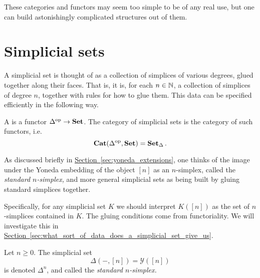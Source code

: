 \documentclass[main.tex]{subfiles}
\begin{document}
These categories and functors may seem too simple to be of any real use, but one can build astonishingly complicated structures out of them.

\section{Simplicial sets}
\label{sec:simplicial_sets}

A simplicial set is thought of as a collection of simplices of various degrees, glued together along their faces. That is, it is, for each $n \in \mathbb{N}$, a collection of simplices of degree $n$, together with rules for how to glue them. This data can be specified efficiently in the following way.

\begin{definition}
  \label{def:simplicial_set}
  A  is a functor $\Delta^{\mathrm{op}} \to \mathbf{Set}$. The category of simplicial sets is the category of such functors, i.e.\
  \begin{equation*}
    \mathbf{Cat}(\Delta^{\mathrm{op}}, \mathbf{Set}) = \operatorname{\mathbf{Set}_{\Delta}}.
  \end{equation*}
\end{definition}

As discussed briefly in \hyperref[sec:yoneda_extensions]{Section~\ref*{sec:yoneda_extensions}}, one thinks of the image under the Yoneda embedding of the object $[n]$ as an $n$-simplex, called the \emph{standard $n$-simplex,} and more general simplicial sets as being built by gluing standard simplices together.

Specifically, for any simplicial set $K$ we should interpret $K([n])$ as the set of $n$-simplices contained in $K$. The gluing conditions come from functoriality. We will investigate this in \hyperref[sec:what_sort_of_data_does_a_simplicial_set_give_us]{Section~\ref*{sec:what_sort_of_data_does_a_simplicial_set_give_us}}.

\begin{definition}
  \label{eg:standard_simplex}
  Let $n \geq 0$. The simplicial set
  \begin{equation*}
    \Delta(-, [n]) = \mathcal{Y}([n])
  \end{equation*}
  is denoted $\Delta^{n}$, and called the \emph{standard $n$-simplex.}
\end{definition}
\end{document}
